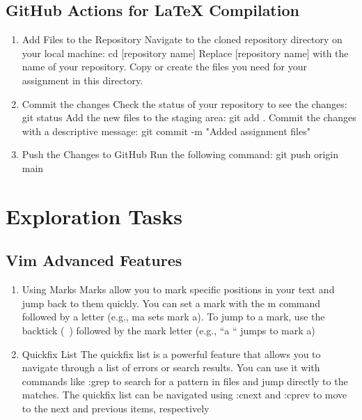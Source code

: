 \documentclass{article}
\begin{document}
\subsection{ GitHub Actions for LaTeX Compilation}
\begin{enumerate}
    \item Add Files to the Repository
    \newline
    \textnormal{Navigate to the cloned repository directory on your local machine:
    cd [repository name]
    Replace [repository name] with the name of your repository.
    Copy or create the files you need for your assignment in this directory.}
    \item Commit the changes
    \newline
    \textnormal{Check the status of your repository to see the changes:
    git status
    Add the new files to the staging area:
    git add .
    Commit the changes with a descriptive message:
    git commit -m "Added assignment files"}
    \item Push the Changes to GitHub
    \newline
    \textnormal{Run the following command:
    git push origin main }
\end{enumerate}
\section{Exploration Tasks}
\subsection{ Vim Advanced Features}
\begin{enumerate}
    \item Using Marks
    \newline
    \textnormal{Marks allow you to mark specific positions in your text and jump back to them quickly. You can set a mark with the m command followed by a letter (e.g., ma sets mark a). To jump to a mark, use the backtick (\ ) followed by the mark letter (e.g., ``a `` jumps to mark a)}
    \item Quickfix List
    \newline
    \textnormal{The quickfix list is a powerful feature that allows you to navigate through a list of errors or search results. You can use it with commands like :grep to search for a pattern in files and jump directly to the matches. The quickfix list can be navigated using :cnext and :cprev to move to the next and previous items, respectively}
\end{enumerate}
\end{document}
